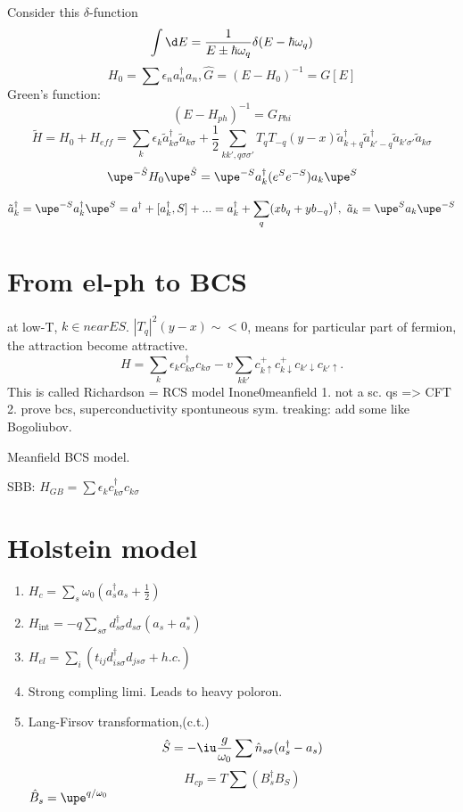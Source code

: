 Consider this $\delta$-function
\[
  \int \d E = \frac{1}{E \pm \hbar \omega_q} \delta(E - \hbar\omega_q)
\]
\[H_0 = \sum \epsilon_n a_n^\dagger a_n, \hat G = (E - H_0)^{-1} = G[E]\]
Green's function:
\[
  (E - H_{ph})^{-1} = G_{Phi}
\]
\[
  \tilde H = H_0 + H_{eff} = \sum_k \epsilon_k \tilde a_{k\sigma}^\dagger \tilde a_{k\sigma}
+ \frac12 \sum_{kk',q\sigma\sigma'} T_q T_{-q} (y-x) \tilde a_{k+q}^\dagger \tilde a_{k'-q}^\dagger \tilde a_{k'\sigma'} \tilde a_{k\sigma}
\]
\[\upe^{-\hat S} H_0 \upe^{\hat S} = \upe^{-S}a_k^\dagger (e^S e^{-S}) a_k \upe^{S}\]

\[
  \tilde a_k^\dagger = \upe^{-S} a_k^\dagger \upe^S = a^\dagger +
  [a_k^\dagger,S] + ... = a_k^\dagger + \sum_q (x
   b_q + y b_{-q})^\dagger,~
  \tilde a_k = \upe^S a_k \upe^{-S}
\]

\section{From el-ph to BCS}

at low-T, $k \in near ES$. $|T_q|^2(y - x) \sim < 0$, means for particular part of fermion, the attraction become attractive.
\[
  H = \sum_k \epsilon_k c_{k\sigma}^\dagger c_{k\sigma} - v \sum_{kk'} c_{k\uparrow}^+ c_{k\downarrow}^+ c_{k'\downarrow} c_{k'\uparrow}.
\]
This is called Richardson = RCS model Inone0meanfield
1. not a sc. qs => CFT
2. prove bcs, superconductivity spontuneous sym. treaking: add some like
 Bogoliubov.

 Meanfield BCS model.

 SBB: $H_{GB} = \sum \epsilon_k c_{k\sigma}^\dagger c_{k\sigma}$

 \section{Holstein model}

 \begin{enumerate}
  \item $H_c = \sum_s \omega_0 (a_s^\dagger a_s + \frac12)$
  \item $H_\text{int} = -q \sum_{s\sigma} d_{s\sigma}^\dagger d_{s\sigma} (a_s + a_s^*)$
  \item $H_{el} = \sum_i (t_{ij} d_{is\sigma}^\dagger d_{js\sigma} + h.c.)$
  \item Strong compling limi. Leads to heavy poloron.
  \item Lang-Firsov transformation,(c.t.)
  \[
    \hat S = -\iu \frac g{\omega_0} \sum \hat n_{s\sigma} (a_s^\dagger - a_s)
  \]
  \[
    H_{cp} = T\sum (B_s^\dagger B_{{S}})
  \]
  $\hat B_s = \upe^{q/\omega_0}$
 \end{enumerate}

